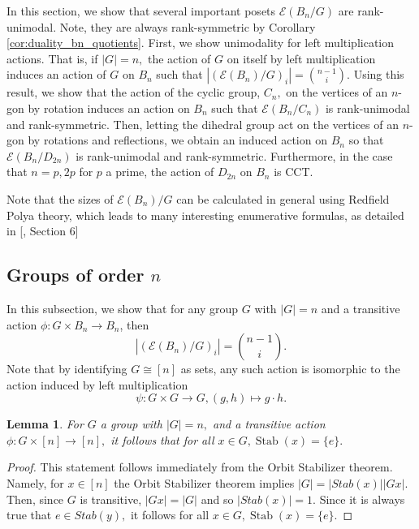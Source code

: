 \documentclass[10 pt]{amsart}
\theoremstyle{plain}
\newtheorem{lem}[thm]{Lemma}
\theoremstyle{definition}
\theoremstyle{remark}
\numberwithin{equation}{section}
\newcommand\ssec{\subsection}
\def\Stab{\operatorname{Stab}}
\begin{document}
In this section, we show that several important posets $\mathcal E(B_n/G)$ are rank-unimodal. Note, they are always rank-symmetric by Corollary \ref{cor:duality_bn_quotients}. First, we show unimodality for left multiplication actions. That is, if $|G| = n,$ the action of $G$ on itself by left multiplication induces an action of $G$ on $B_n$ such that $|(\mathcal E(B_n)/G)_i| = \binom {n-1} i.$ Using this result, we show that the action of the cyclic group, $C_n,$ on the vertices of an $n$-gon by rotation induces an action on $B_n$ such that $\mathcal E(B_n/C_n)$ is rank-unimodal and rank-symmetric. Then, letting the dihedral group act on the vertices of an $n$-gon by rotations and reflections, we obtain an induced action on $B_n$ so that $\mathcal E(B_n/D_{2n})$ is rank-unimodal and rank-symmetric. Furthermore, in the case that $n = p,2p$ for $p$ a prime, the action of $D_{2n}$ on $B_n$ is CCT.

Note that the sizes of $\mathcal E(B_n)/G$ can be calculated in general using Redfield Polya theory, which leads to many interesting enumerative formulas, as detailed in [\cite{reu_report}, Section 6]

\ssec{Groups of order $n$}

In this subsection, we show that for any group $G$ with $|G| = n$ and a transitive action $\phi: G \times B_n \rightarrow B_n$, then $$|(\mathcal E(B_n)/G)_i| = \binom {n-1}{i}.$$ 
Note that by identifying $G \cong [n]$ as sets, any such action is isomorphic to the action induced by left multiplication $$\psi: G\times G \rightarrow G,(g,h)\mapsto g \cdot h.$$ 

\begin{lem}
\label{lem:stabilizer_one}
For $G$ a group with $|G| = n,$ and a transitive action $\phi:G \times [n] \rightarrow [n],$ it follows that for all $x \in G,\Stab(x) = \{e\}.$
\end{lem}
\begin{proof}
This statement follows immediately from the Orbit Stabilizer theorem. Namely, for $x \in [n]$ the Orbit Stabilizer theorem implies $|G| = |Stab(x)||Gx|.$ Then, since $G$ is transitive, $|Gx| = |G|$ and so $|Stab(x)| = 1.$ Since it is always true that $e \in Stab(y),$ it follows for all $x \in G,\Stab(x) = \{e\}.$
\end{proof}
\end{document}
